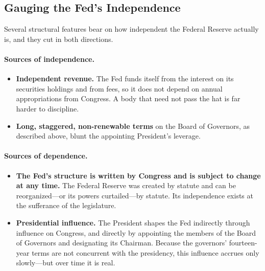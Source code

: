 
\subsection{Gauging the Fed's Independence}

Several structural features bear on how independent the Federal Reserve actually is, and they cut in both directions.

\paragraph{Sources of independence.}
\begin{itemize}
    \item \textbf{Independent revenue.} The Fed funds itself from the interest on its securities holdings and from fees, so it does not depend on annual appropriations from Congress. A body that need not pass the hat is far harder to discipline.
    \item \textbf{Long, staggered, non-renewable terms} on the Board of Governors, as described above, blunt the appointing President's leverage.
\end{itemize}

\paragraph{Sources of dependence.}
\begin{itemize}
    \item \textbf{The Fed's structure is written by Congress and is subject to change at any time.} The Federal Reserve was created by statute and can be reorganized---or its powers curtailed---by statute. Its independence exists at the sufferance of the legislature.
    \item \textbf{Presidential influence.} The President shapes the Fed indirectly through influence on Congress, and directly by appointing the members of the Board of Governors and designating its Chairman. Because the governors' fourteen-year terms are not concurrent with the presidency, this influence accrues only slowly---but over time it is real.
\end{itemize}

